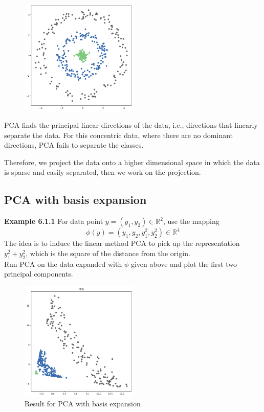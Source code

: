 \documentclass[12pt]{book}
\theoremstyle{definition}
\theoremstyle{remark}
\newcommand{\R}{\mathbb{R}}
\begin{document}
\begin{figure}[h]
\centering
\includegraphics[width=0.5\textwidth]{601-6-1-1.png}
\caption{}
\label{601-6-1-1}
\end{figure}

PCA finds the principal linear directions of the data, i.e., directions that linearly separate the data. For this concentric data, where there are no dominant directions, PCA fails to separate the classes. 

Therefore, we project the data onto a higher dimensional space in which the data is sparse and easily separated, then we work on the projection.

\subsection{PCA with basis expansion}

\textbf{Example 6.1.1}
For data point $y = (y_1, y_2)\in \R^2$, use the mapping 
\[\phi(y) = (y_1,y_2,y_1^2,y_2^2)\in\R^4\]
The idea is to induce the linear method PCA to pick up the
representation $y_1^2+y_2^2$, which is the square of the distance from the origin.\\

Run PCA on the data expanded with $\phi$ given above and plot the first two principal components.

\begin{figure}[h]
\centering
\includegraphics[width=0.5\textwidth]{601-6-1-2.png}
\caption{Result for PCA with basis expansion}
\label{601-6-1-2}
\end{figure}
\end{document}
